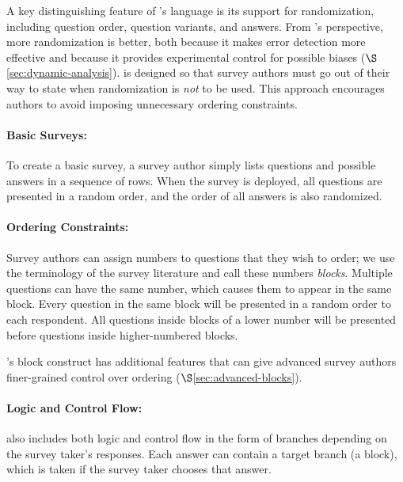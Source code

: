 A key distinguishing feature of \surveyman{}'s language is its support
for randomization, including question order, question variants, and
answers. From \surveyman{}'s perspective, more randomization is
better, both because it makes error detection more effective and
because it provides experimental control for possible biases
($\S$\ref{sec:dynamic-analysis}). \surveyman{} is designed so that
survey authors must go out of their way to state when randomization is
\emph{not} to be used. This approach encourages authors to avoid
imposing unnecessary ordering constraints.

\paragraph{Basic Surveys:}
To create a basic survey, a survey author simply lists questions and
possible answers in a sequence of rows. When the survey is deployed,
all questions are presented in a random order, and the order of all
answers is also randomized.

\paragraph{Ordering Constraints:}
Survey authors can assign numbers to questions that they wish
to order; we use the terminology of the survey literature and call these numbers
\emph{blocks}. Multiple questions can have the same number, which
causes them to appear in the same block. Every question in the same block will be
presented in a random order to each respondent. All questions inside
blocks of a lower number will be presented before questions inside
higher-numbered blocks.

\surveyman{}'s block construct has additional features that can give
advanced survey authors finer-grained control over ordering
($\S$\ref{sec:advanced-blocks}).

\paragraph{Logic and Control Flow:}
\surveyman{} also includes both logic and control flow in the form of
branches depending on the survey taker's responses. Each answer can
contain a target branch (a block), which is taken if the survey taker
chooses that answer.





